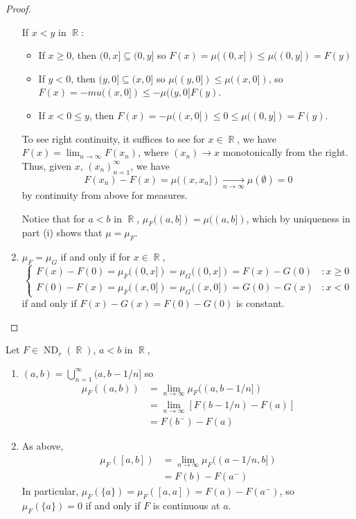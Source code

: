 \documentclass[12pt, a4paper]{memoir}
\DeclareMathOperator{\R}{{\mathbb{R}}}
\theoremstyle{nonumberplain}
\newtheorem{proof}{Proof}
\DeclareMathOperator{\ND}{ND}
\begin{document}
\begin{proof}
\begin{enumerate}
            If $x<y$ in $\R$:
            \begin{itemize}[nolistsep]
                \item If $x\geq 0$, then $(0,x]\subseteq(0,y]$ so $F(x)=\mu((0,x])\leq\mu((0,y])=F(y)$
                \item If $y<0$, then $(y,0]\subseteq(x,0]$ so $\mu((y,0])\leq\mu((x,0])$, so $F(x)=-mu((x,0])\leq -\mu((y,0]F(y)$.
                \item If $x<0\leq y$, then $F(x)=-\mu((x,0])\leq 0\leq \mu((0,y])=F(y)$.
            \end{itemize}
            To see right continuity, it suffices to see for $x\in\R$, we have $F(x)=\lim_{n\to\infty} F(x_n)$, where $(x_n)\to x$ monotonically from the right.
            Thus, given $x$, $(x_n)_{n=1}^\infty$, we have
            \begin{equation*}
                F(x_n)-F(x)=\mu((x,x_n])\underset{n\to\infty}\longrightarrow\mu(\emptyset)=0 %
            \end{equation*}
            by continuity from above for measures.

            Notice that for $a<b$ in $\R$, $\mu_F((a,b])=\mu((a,b])$, which by uniqueness in part (i) shows that $\mu=\mu_F$.
        \item $\mu_F=\mu_G$ if and only if for $x\in\R$,
            \begin{equation*}
                \begin{cases}
                    F(x)-F(0)=\mu_F((0,x])=\mu_G((0,x])=F(x)-G(0)&: x\geq 0\\
                    F(0)-F(x)=\mu_F((x,0])=\mu_G((x,0])=G(0)-G(x)&: x<0
                \end{cases}
            \end{equation*}
            if and only if $F(x)-G(x)=F(0)-G(0)$ is constant.
    \end{enumerate}
\end{proof}
Let $F\in\ND_r(\R)$, $a<b$ in $\R$,
\begin{enumerate}[nolistsep]
    \item $(a,b)=\bigcup_{n=1}^\infty(a,b-1/n]$ so
        \begin{align*}
            \mu_F((a,b)) &= \lim_{n\to\infty}\mu_F((a,b-1/n])\\ %
                         &= \lim_{n\to\infty}[F(b-1/n)-F(a)]\\
                         &= F(b^-)-F(a)
        \end{align*}
    \item As above,
        \begin{align*}
            \mu_F([a,b]) &= \lim_{n\to\infty}\mu_F((a-1/n,b])\\ %
                         &= F(b)-F(a^-)
        \end{align*}
        In particular, $\mu_F(\{a\})=\mu_F([a,a])=F(a)-F(a^-)$, so $\mu_F(\{a\})=0$ if and only if $F$ is continuous at $a$.
\end{enumerate}
\end{document}
